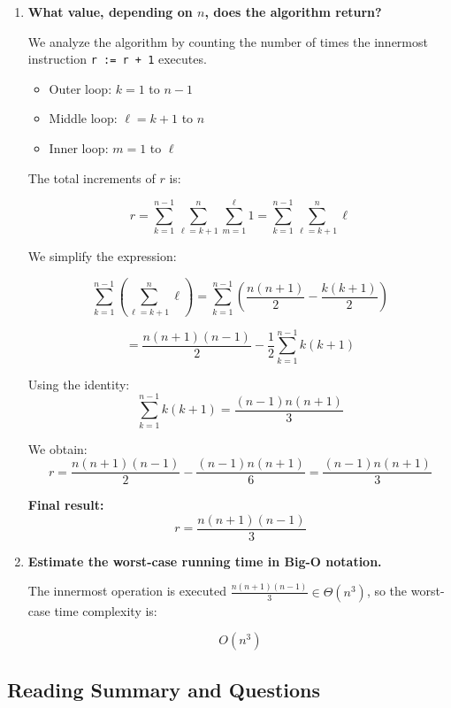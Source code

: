 \documentclass{article}
\theoremstyle{theorem}
\theoremstyle{definition}
\theoremstyle{remark}
\begin{document}
\begin{enumerate}
    \item \textbf{What value, depending on \( n \), does the algorithm return?}

    We analyze the algorithm by counting the number of times the innermost instruction \texttt{r := r + 1} executes.

    \begin{itemize}
        \item Outer loop: \( k = 1 \) to \( n-1 \)
        \item Middle loop: \( \ell = k+1 \) to \( n \)
        \item Inner loop: \( m = 1 \) to \( \ell \)
    \end{itemize}

    The total increments of \( r \) is:

    \[
    r = \sum_{k=1}^{n-1} \sum_{\ell=k+1}^{n} \sum_{m=1}^{\ell} 1 = \sum_{k=1}^{n-1} \sum_{\ell=k+1}^{n} \ell
    \]

    We simplify the expression:

    \[
    \sum_{k=1}^{n-1} \left( \sum_{\ell=k+1}^{n} \ell \right)
    = \sum_{k=1}^{n-1} \left( \frac{n(n+1)}{2} - \frac{k(k+1)}{2} \right)
    \]

    \[
    = \frac{n(n+1)(n-1)}{2} - \frac{1}{2} \sum_{k=1}^{n-1} k(k+1)
    \]

    Using the identity:
    \[
    \sum_{k=1}^{n-1} k(k+1) = \frac{(n-1)n(n+1)}{3}
    \]

    We obtain:
    \[
    r = \frac{n(n+1)(n-1)}{2} - \frac{(n-1)n(n+1)}{6} = \frac{(n-1)n(n+1)}{3}
    \]

    \textbf{Final result:}
    \[
    \boxed{r = \frac{n(n+1)(n-1)}{3}}
    \]

    \item \textbf{Estimate the worst-case running time in Big-O notation.}

    The innermost operation is executed \( \frac{n(n+1)(n-1)}{3} \in \Theta(n^3) \), so the worst-case time complexity is:

    \[
    \boxed{O(n^3)}
    \]
\end{enumerate}

\subsection*{Reading Summary and Questions}
\end{document}
